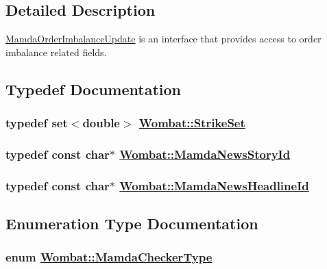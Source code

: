\subsection{Detailed Description}
\hyperlink{classWombat_1_1MamdaOrderImbalanceUpdate}{Mamda\-Order\-Imbalance\-Update} is an interface that provides access to order imbalance related fields. 

\subsection{Typedef Documentation}
\hypertarget{namespaceWombat_302d481a195bac5c9315c82cdbc79447}{
\subsubsection[StrikeSet]{\setlength{\rightskip}{0pt plus 5cm}typedef set$<$double$>$ \hyperlink{namespaceWombat_302d481a195bac5c9315c82cdbc79447}{Wombat::Strike\-Set}}}
\label{namespaceWombat_302d481a195bac5c9315c82cdbc79447}


\hypertarget{namespaceWombat_f7b94f4bb44eb78420c0d3ba0413424e}{
\subsubsection[MamdaNewsStoryId]{\setlength{\rightskip}{0pt plus 5cm}typedef const char$\ast$ \hyperlink{namespaceWombat_f7b94f4bb44eb78420c0d3ba0413424e}{Wombat::Mamda\-News\-Story\-Id}}}
\label{namespaceWombat_f7b94f4bb44eb78420c0d3ba0413424e}


\hypertarget{namespaceWombat_cb354a5fc91d5b728f8f1255aae3e196}{
\subsubsection[MamdaNewsHeadlineId]{\setlength{\rightskip}{0pt plus 5cm}typedef const char$\ast$ \hyperlink{namespaceWombat_cb354a5fc91d5b728f8f1255aae3e196}{Wombat::Mamda\-News\-Headline\-Id}}}
\label{namespaceWombat_cb354a5fc91d5b728f8f1255aae3e196}




\subsection{Enumeration Type Documentation}
\hypertarget{namespaceWombat_f4416a38ea95baf743f07d19ac9b6a4a}{
\subsubsection[MamdaCheckerType]{\setlength{\rightskip}{0pt plus 5cm}enum \hyperlink{namespaceWombat_f4416a38ea95baf743f07d19ac9b6a4a}{Wombat::Mamda\-Checker\-Type}}}
\label{namespaceWombat_f4416a38ea95baf743f07d19ac9b6a4a}


